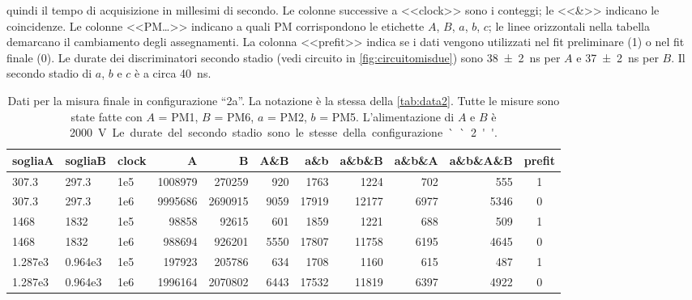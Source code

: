 \begin{landscape}
\begin{table}[p]
{		quindi il tempo di acquisizione in millesimi di secondo.
		Le colonne successive a <<clock>> sono i conteggi; le <<\&>> indicano le coincidenze.
		Le colonne <<PM\dots>> indicano a quali PM corrispondono le etichette $A$, $B$, $a$, $b$, $c$;
		le linee orizzontali nella tabella demarcano il cambiamento degli assegnamenti.
		La colonna <<prefit>> indica se i dati vengono utilizzati nel fit preliminare (1) o nel fit finale (0).
		Le durate dei discriminatori secondo stadio (vedi circuito in \autoref{fig:circuitomisdue})
		sono \SI{38\pm2}{ns} per $A$ e \SI{37\pm2}{ns} per $B$.
		Il secondo stadio di $a$, $b$ e $c$ è a circa \SI{40}{ns}.}
	\end{table}
\end{landscape}

\begin{table}[p]
	\small
	\hspace{-5em}
	\begin{tabular}{ll|lrrrrrrr|c}
		sogliaA & sogliaB & clock & A & B & A\&B & a\&b & a\&b\&B & a\&b\&A & a\&b\&A\&B & prefit \\
		\hline
		307.3 & 297.3 & 1e5 & 1008979 & 270259 & 920 & 1763 & 1224 & 702 & 555  & 1               \\
		307.3 & 297.3 & 1e6 & 9995686 & 2690915 & 9059 & 17919 & 12177 & 6977 & 5346 & 0          \\
		1468 & 1832 & 1e5 & 98858 & 92615 & 601 & 1859 & 1221 & 688 & 509  & 1                    \\
		1468 & 1832 & 1e6 & 988694 & 926201 & 5550 & 17807 & 11758 & 6195 & 4645 & 0              \\
		1.287e3 & 0.964e3 & 1e5 & 197923 & 205786 & 634 & 1708 & 1160 & 615 & 487  & 1            \\
		1.287e3 & 0.964e3 & 1e6 & 1996164 & 2070802 & 6443 & 17532 & 11819 & 6397 & 4922 & 0      
	\end{tabular}
	\caption{\label{tab:data2a}
	Dati per la misura finale in configurazione ``2a''.
	La notazione è la stessa della \autoref{tab:data2}.
	Tutte le misure sono state fatte con $A$ = PM1, $B$ = PM6, $a$ = PM2, $b$ = PM5.
	L'alimentazione di $A$ e $B$ è \SI{2000}V.
	Le durate del secondo stadio sono le stesse della configurazione ``2''.}
\end{table}

